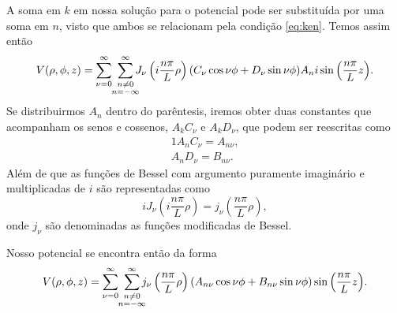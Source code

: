 \documentclass{article}
\begin{document}
A soma em $k$ em nossa solução para o potencial pode ser substituída por uma soma em $n$, visto que ambos se relacionam pela condição \eqref{eq:ken}. Temos assim então
\begin{equation}
 V(\rho,\phi,z) = \sum_{\nu = 0}^{\infty} \ \sum_{\mathclap{\substack{n \neq 0 \\ n = -\infty}}}^{\infty} J_{\nu}\left(i \frac{n \pi}{L}\rho \right)
 (C_{\nu}\cos{\nu \phi} + D_{\nu}\sin{\nu \phi})A_n i \sin{\left( \frac{n \pi}{L}z \right)} \mathrm{.}
\end{equation}
Se distribuirmos $A_n$ dentro do parêntesis, iremos obter duas constantes que acompanham os senos e cossenos, $A_k C_{\nu}$ e $A_k D_{\nu}$, que podem ser reescritas
como
\begin{alignat}{1}
 A_n C_{\nu} = A_{n \nu}\mathrm{,}\\
 A_n D_{\nu} = B_{n \nu}\mathrm{.}
\end{alignat}
Além de que as funções de Bessel com argumento puramente imaginário e multiplicadas de $i$ são representadas como
\begin{equation}
 i J_{\nu}\left(i \frac{n \pi}{L}\rho \right) = j_{\nu}\left( \frac{n \pi}{L}\rho \right)\mathrm{,}
\end{equation}
onde $j_{\nu}$ são denominadas as funções modificadas de Bessel.

Nosso potencial se encontra então da forma
\begin{equation}
 V(\rho,\phi,z) = \sum_{\nu = 0}^{\infty} \ \sum_{\mathclap{\substack{n \neq 0 \\ n = -\infty}}}^{\infty} j_{\nu}\left( \frac{n \pi}{L}\rho \right)
 (A_{n \nu} \cos{\nu \phi} + B_{n \nu} \sin{\nu \phi}) \sin{\left( \frac{n \pi}{L}z \right)} \mathrm{.}
\end{equation}
\end{document}
